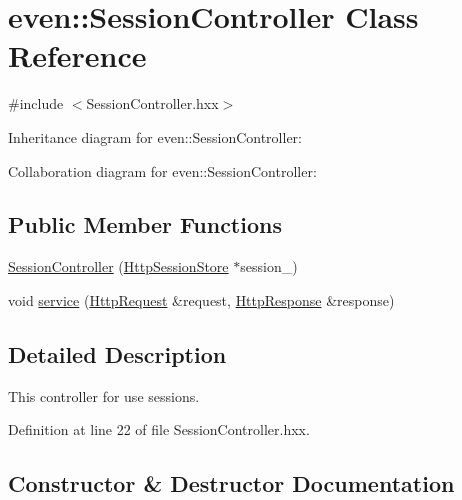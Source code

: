 \hypertarget{classeven_1_1_session_controller}{}\section{even\+:\+:Session\+Controller Class Reference}
\label{classeven_1_1_session_controller}


{\ttfamily \#include $<$Session\+Controller.\+hxx$>$}



Inheritance diagram for even\+:\+:Session\+Controller\+:


Collaboration diagram for even\+:\+:Session\+Controller\+:
\subsection*{Public Member Functions}
\begin{DoxyCompactItemize}
\item 
\mbox{\hyperlink{classeven_1_1_session_controller_acc43dc5d6d97ccf63a4ac178f907618e}{Session\+Controller}} (\mbox{\hyperlink{classstefanfrings_1_1_http_session_store}{Http\+Session\+Store}} $\ast$session\+\_\+)
\item 
void \mbox{\hyperlink{classeven_1_1_session_controller_a2eb65af29d53ff51d709cc892611d5a9}{service}} (\mbox{\hyperlink{classstefanfrings_1_1_http_request}{Http\+Request}} \&request, \mbox{\hyperlink{classstefanfrings_1_1_http_response}{Http\+Response}} \&response)
\end{DoxyCompactItemize}


\subsection{Detailed Description}
This controller for use sessions. 

Definition at line 22 of file Session\+Controller.\+hxx.



\subsection{Constructor \& Destructor Documentation}
\mbox{\label{classeven_1_1_session_controller_acc43dc5d6d97ccf63a4ac178f907618e}} 
